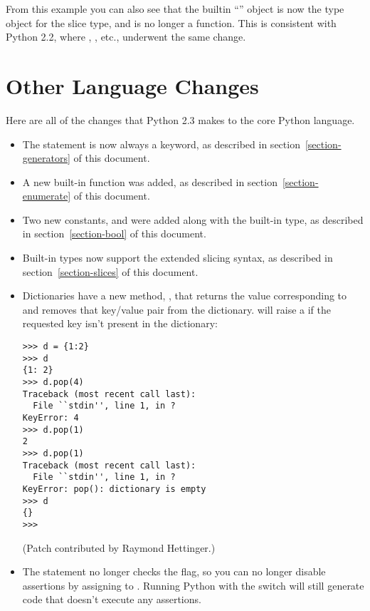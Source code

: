 \documentclass{howto}
\begin{document}
From this example you can also see that the builtin ``''
object is now the type object for the slice type, and is no longer a
function.  This is consistent with Python 2.2, where ,
, etc., underwent the same change.


\section{Other Language Changes}

Here are all of the changes that Python 2.3 makes to the core Python
language.

\begin{itemize}
\item The  statement is now always a keyword, as
described in section~\ref{section-generators} of this document.

\item A new built-in function  
was added, as described in section~\ref{section-enumerate} of this
document.

\item Two new constants,  and  were
added along with the built-in  type, as described in
section~\ref{section-bool} of this document.

\item Built-in types now support the extended slicing syntax, 
as described in section~\ref{section-slices} of this document.

\item Dictionaries have a new method, , that
returns the value corresponding to  and removes that
key/value pair from the dictionary.   will raise a
 if the requested key isn't present in the
dictionary:

\begin{verbatim}
>>> d = {1:2}
>>> d
{1: 2}
>>> d.pop(4)
Traceback (most recent call last):
  File ``stdin'', line 1, in ?
KeyError: 4
>>> d.pop(1)
2
>>> d.pop(1)
Traceback (most recent call last):
  File ``stdin'', line 1, in ?
KeyError: pop(): dictionary is empty
>>> d
{}
>>>
\end{verbatim}

(Patch contributed by Raymond Hettinger.)

\item The  statement no longer  checks the 
flag, so you can no longer disable assertions by assigning to .
Running Python with the  switch will still generate 
code that doesn't execute any assertions.


\end{itemize}
\end{document}

